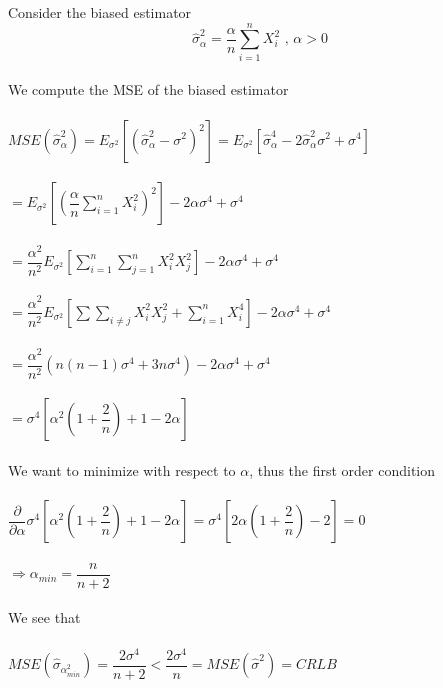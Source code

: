 \documentclass{article}
\begin{document}
\begin{itemize}
    Consider the biased estimator\\
    $$\hat{\sigma}_\alpha^2=\dfrac{\alpha}{n}\sum_{i=1}^nX_i^2\text{ , }\alpha>0$$\\
    We compute the MSE of the biased estimator\\\\
    $MSE(\hat{\sigma}_\alpha^2)=E_{\sigma^2}[(\hat{\sigma}_\alpha^2-\sigma^2)^2]=E_{\sigma^2}[\hat{\sigma}_\alpha^4-2\hat{\sigma}_\alpha^2\sigma^2+\sigma^4]$\\\\
    $=E_{\sigma^2}[(\dfrac{\alpha}{n}\sum_{i=1}^nX_i^2)^2]-2\alpha\sigma^4+\sigma^4$\\\\
    $=\dfrac{\alpha^2}{n^2}E_{\sigma^2}[\sum_{i=1}^n\sum_{j=1}^nX_i^2X_j^2]-2\alpha\sigma^4+\sigma^4$\\\\
    $=\dfrac{\alpha^2}{n^2}E_{\sigma^2}[\sum\sum_{i\neq j}X_i^2X_j^2+\sum_{i=1}^nX_i^4]-2\alpha\sigma^4+\sigma^4$\\\\
    $=\dfrac{\alpha^2}{n^2}(n(n-1)\sigma^4+3n\sigma^4)-2\alpha\sigma^4+\sigma^4$\\\\
    $=\sigma^4[\alpha^2(1+\dfrac{2}{n})+1-2\alpha]$\\\\
    We want to minimize with respect to $\alpha$, thus the first order condition\\\\
    $\dfrac{\partial}{\partial\alpha}\sigma^4[\alpha^2(1+\dfrac{2}{n})+1-2\alpha]=\sigma^4[2\alpha(1+\dfrac{2}{n})-2]=0$\\\\
    $\Rightarrow\alpha_{min}=\dfrac{n}{n+2}$\\\\
    We see that\\\\
    $MSE(\hat{\sigma}_\alpha_{min}^2)=\dfrac{2\sigma^4}{n+2}<\dfrac{2\sigma^4}{n}=MSE(\hat{\sigma}^2)=CRLB$
\end{itemize}
\pagebreak
\end{document}
